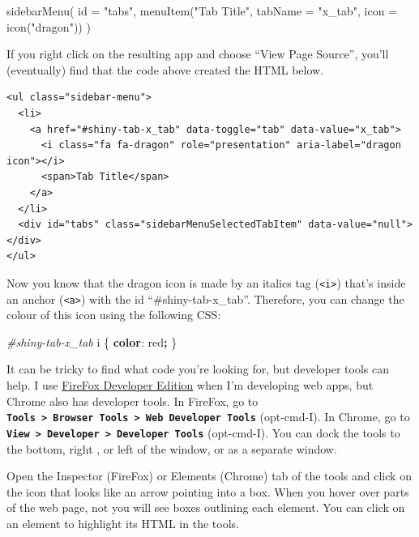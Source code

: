 \documentclass[
]{book}
\newenvironment{Shaded}{\begin{snugshade}}{\end{snugshade}}
\newcommand{\AttributeTok}[1]{\textcolor[rgb]{0.77,0.63,0.00}{#1}}
\newcommand{\ConstantTok}[1]{\textcolor[rgb]{0.00,0.00,0.00}{#1}}
\newcommand{\FunctionTok}[1]{\textcolor[rgb]{0.00,0.00,0.00}{#1}}
\newcommand{\KeywordTok}[1]{\textcolor[rgb]{0.13,0.29,0.53}{\textbf{#1}}}
\newcommand{\NormalTok}[1]{#1}
\newcommand{\OperatorTok}[1]{\textcolor[rgb]{0.81,0.36,0.00}{\textbf{#1}}}
\newcommand{\PreprocessorTok}[1]{\textcolor[rgb]{0.56,0.35,0.01}{\textit{#1}}}
\newcommand{\StringTok}[1]{\textcolor[rgb]{0.31,0.60,0.02}{#1}}
\begin{document}
\begin{Shaded}
\begin{Highlighting}[]
\FunctionTok{sidebarMenu}\NormalTok{(}
    \AttributeTok{id =} \StringTok{"tabs"}\NormalTok{,}
    \FunctionTok{menuItem}\NormalTok{(}\StringTok{"Tab Title"}\NormalTok{, }\AttributeTok{tabName =} \StringTok{"x\_tab"}\NormalTok{, }\AttributeTok{icon =} \FunctionTok{icon}\NormalTok{(}\StringTok{"dragon"}\NormalTok{))}
\NormalTok{)}
\end{Highlighting}
\end{Shaded}

If you right click on the resulting app and choose ``View Page Source'', you'll (eventually) find that the code above created the HTML below.

\begin{verbatim}
<ul class="sidebar-menu">
  <li>
    <a href="#shiny-tab-x_tab" data-toggle="tab" data-value="x_tab">
      <i class="fa fa-dragon" role="presentation" aria-label="dragon icon"></i>
      <span>Tab Title</span>
    </a>
  </li>
  <div id="tabs" class="sidebarMenuSelectedTabItem" data-value="null"></div>
</ul>
\end{verbatim}

Now you know that the dragon icon is made by an italics tag (\texttt{\textless{}i\textgreater{}}) that's inside an anchor (\texttt{\textless{}a\textgreater{}}) with the id ``\#shiny-tab-x\_tab''. Therefore, you can change the colour of this icon using the following CSS:

\begin{Shaded}
\begin{Highlighting}[]
\PreprocessorTok{\#shiny{-}tab{-}x\_tab}\NormalTok{ i \{ }\KeywordTok{color}\NormalTok{: }\ConstantTok{red}\OperatorTok{;}\NormalTok{ \}}
\end{Highlighting}
\end{Shaded}

It can be tricky to find what code you're looking for, but developer tools can help. I use \href{https://www.mozilla.org/en-US/firefox/developer/}{FireFox Developer Edition} when I'm developing web apps, but Chrome also has developer tools. In FireFox, go to \textbf{\texttt{Tools\ \textgreater{}\ Browser\ Tools\ \textgreater{}\ Web\ Developer\ Tools}} (opt-cmd-I). In Chrome, go to \textbf{\texttt{View\ \textgreater{}\ Developer\ \textgreater{}\ Developer\ Tools}} (opt-cmd-I). You can dock the tools to the bottom, right , or left of the window, or as a separate window.

Open the Inspector (FireFox) or Elements (Chrome) tab of the tools and click on the icon that looks like an arrow pointing into a box. When you hover over parts of the web page, not you will see boxes outlining each element. You can click on an element to highlight its HTML in the tools.
\end{document}
